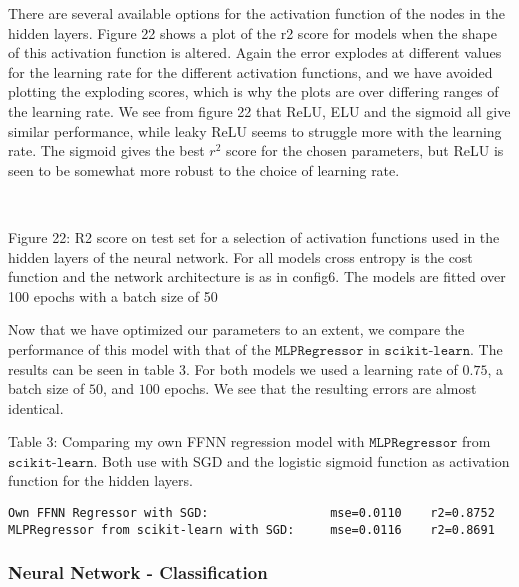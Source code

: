\documentclass[11pt]{article}
\begin{document}
There are several available options for the activation function of the
nodes in the hidden layers. Figure 22 shows a plot of the r2 score for
models when the shape of this activation function is altered. Again the
error explodes at different values for the learning rate for the
different activation functions, and we have avoided plotting the
exploding scores, which is why the plots are over differing ranges of
the learning rate. We see from figure 22 that ReLU, ELU and the sigmoid
all give similar performance, while leaky ReLU seems to struggle more
with the learning rate. The sigmoid gives the best \(r^2\) score for the
chosen parameters, but ReLU is seen to be somewhat more robust to the
choice of learning rate.

    \begin{center}
    \end{center}
    { \hspace*{\fill} \\}
    
    Figure 22: R2 score on test set for a selection of activation functions
used in the hidden layers of the neural network. For all models cross
entropy is the cost function and the network architecture is as in
config6. The models are fitted over 100 epochs with a batch size of 50

    Now that we have optimized our parameters to an extent, we compare the
performance of this model with that of the \(\texttt{MLPRegressor}\) in
\(\texttt{scikit-learn}\). The results can be seen in table 3. For both
models we used a learning rate of \(0.75\), a batch size of \(50\), and
\(100\) epochs. We see that the resulting errors are almost identical.

    Table 3: Comparing my own FFNN regression model with
\(\texttt{MLPRegressor}\) from \(\texttt{scikit-learn}\). Both use with
SGD and the logistic sigmoid function as activation function for the
hidden layers.


    \begin{Verbatim}[commandchars=\\\{\}]
Own FFNN Regressor with SGD:                 mse=0.0110    r2=0.8752
MLPRegressor from scikit-learn with SGD:     mse=0.0116    r2=0.8691
    \end{Verbatim}

    \hypertarget{neural-network---classification}{%
\subsubsection{Neural Network -
Classification}\label{neural-network---classification}}
\end{document}
